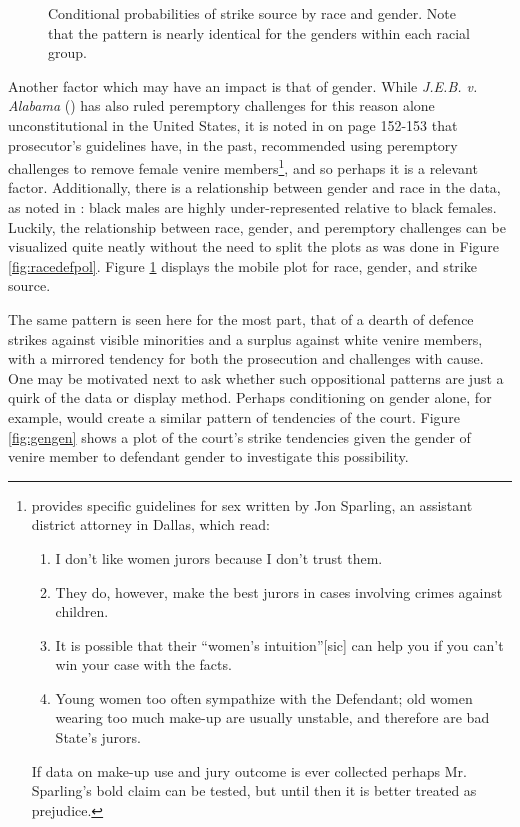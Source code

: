 \begin{figure}[h!]
  \centering
  \caption[Strike Source by Race and Gender (Sunshine)]
  {\footnotesize Conditional probabilities of strike source by race and gender. Note that the pattern is nearly identical for the genders within
    each racial group.} \label{fig:racegenpol}
\end{figure}

Another factor which may have an impact is that of gender. While \textit{J.E.B. v. Alabama} (\cite{jebvalabama}) has also ruled
peremptory challenges for this reason alone unconstitutional in the United States, it is noted in \cite{vandykejurysel} on page
152-153 that prosecutor's guidelines have, in the past, recommended using peremptory challenges to remove female venire
members\footnote{\citeauthor{vandykejurysel} provides specific guidelines for sex written by Jon Sparling, an assistant district
  attorney in Dallas, which read: \begin{enumerate} 
  \item I don't like women jurors because I don't trust them.
  \item They do, however, make the best jurors in cases involving crimes against children.
  \item It is possible that their ``women's intuition''[sic] can help you if you can't win your case with the facts.
  \item Young women too often sympathize with the Defendant; old women wearing too much make-up are usually unstable, and
    therefore are bad State's jurors.
  \end{enumerate}
  If data on make-up use and jury outcome is ever collected perhaps Mr. Sparling's bold claim can be tested, but until then it is
  better treated as prejudice.}, and so perhaps it is a relevant factor. Additionally, there is a relationship between gender and
race in the data, as noted in \cite{JurySunshineProj}: black males are highly under-represented relative to black
females. Luckily, the relationship between race, gender, and peremptory challenges can be visualized quite neatly without the need
to split the plots as was done in Figure \ref{fig:racedefpol}. Figure \ref{fig:racegenpol} displays the mobile plot for race,
gender, and strike source.

The same pattern is seen here for the most part, that of a dearth of defence strikes against visible minorities and a surplus
against white venire members, with a mirrored tendency for both the prosecution and challenges with cause. One may be motivated
next to ask whether such oppositional patterns are just a quirk of the data or display method. Perhaps conditioning on gender
alone, for example, would create a similar pattern of tendencies of the court. Figure \ref{fig:gengen} shows a plot of the court's
strike tendencies given the gender of venire member to defendant gender to investigate this possibility.

